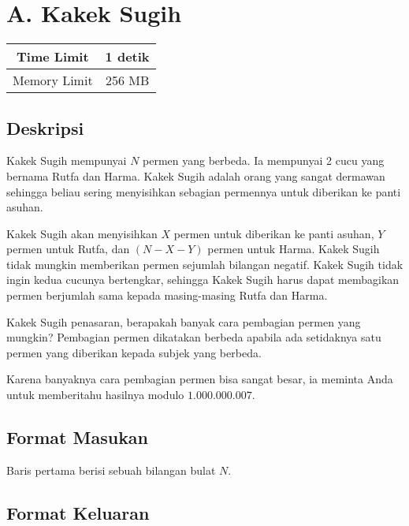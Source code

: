 \documentclass{article}
\begin{document}
\section*{\hfil A. Kakek Sugih\hfil}

\begin{center}
\begin{tabular}{ |cc| } 
 \hline
 Time Limit & 1 detik \\ 
 \hline
 Memory Limit & 256 MB \\
 \hline
\end{tabular}
\end{center}

\subsection*{Deskripsi}

\par\indent Kakek Sugih mempunyai $N$ permen yang berbeda. Ia mempunyai 2 cucu yang bernama Rutfa dan Harma. Kakek Sugih adalah orang yang sangat dermawan sehingga beliau sering menyisihkan sebagian permennya untuk diberikan ke panti asuhan. 

\par Kakek Sugih akan menyisihkan $X$ permen untuk diberikan ke panti asuhan, $Y$ permen untuk Rutfa, dan $(N - X - Y)$ permen untuk Harma. Kakek Sugih tidak mungkin memberikan permen sejumlah bilangan negatif. Kakek Sugih tidak ingin kedua cucunya bertengkar, sehingga Kakek Sugih harus dapat membagikan permen berjumlah sama kepada masing-masing Rutfa dan Harma.

\par Kakek Sugih penasaran, berapakah banyak cara pembagian permen yang mungkin? Pembagian permen dikatakan berbeda apabila ada setidaknya satu permen yang diberikan kepada subjek yang berbeda. 

\par Karena banyaknya cara pembagian permen bisa sangat besar, ia meminta Anda untuk memberitahu hasilnya modulo $1.000.000.007$.

\subsection*{Format Masukan}
\par\noindent Baris pertama berisi sebuah bilangan bulat $N$.

\subsection*{Format Keluaran}
\end{document}
